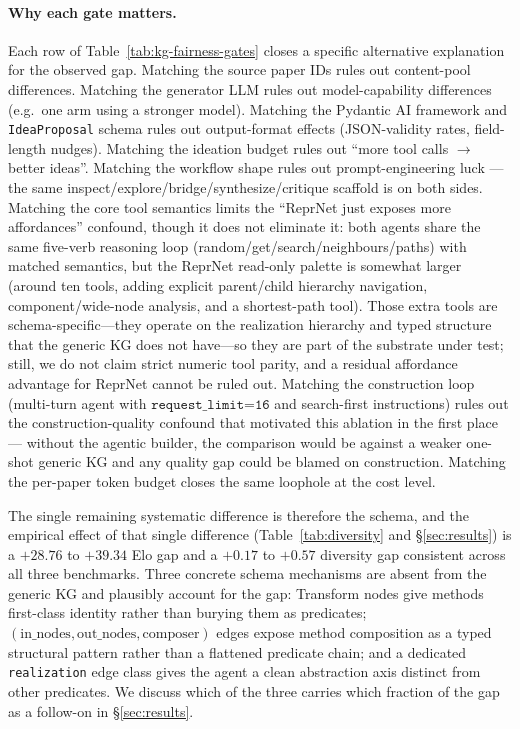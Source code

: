 \documentclass[10pt,twocolumn]{article}
\begin{document}
\paragraph{Why each gate matters.}  Each row of
Table~\ref{tab:kg-fairness-gates} closes a specific alternative
explanation for the observed gap.  Matching the source paper IDs
rules out content-pool differences.  Matching the generator LLM
rules out model-capability differences (e.g.\ one arm using a
stronger model).  Matching the Pydantic AI framework and
\texttt{IdeaProposal} schema rules out output-format effects
(JSON-validity rates, field-length nudges).  Matching the ideation
budget rules out ``more tool calls $\to$ better ideas''.  Matching
the workflow shape rules out prompt-engineering luck --- the same
inspect/explore/bridge/synthesize/critique scaffold is on both
sides.  Matching the core tool semantics limits the
``ReprNet just exposes more affordances'' confound, though it does not
eliminate it: both agents share the same five-verb reasoning loop
(random/get/search/neighbours/paths) with matched semantics, but the
ReprNet read-only palette is somewhat larger (around ten tools, adding
explicit parent/child hierarchy navigation, component/wide-node
analysis, and a shortest-path tool).  Those extra tools are
schema-specific---they operate on the realization hierarchy and typed
structure that the generic KG does not have---so they are part of the
substrate under test; still, we do not claim strict numeric tool
parity, and a residual affordance advantage for ReprNet cannot be
ruled out.  Matching the
construction loop (multi-turn agent with $\texttt{request\_limit=16}$
and search-first instructions) rules out the construction-quality
confound that motivated this ablation in the first place ---
without the agentic builder, the comparison would be against a
weaker one-shot generic KG and any quality gap could be blamed on
construction.  Matching the per-paper token budget closes the same
loophole at the cost level.

The single remaining systematic difference is therefore the
schema, and the empirical effect of that single difference
(Table~\ref{tab:diversity} and \S\ref{sec:results}) is a
$+28.76$ to $+39.34$ Elo gap and a $+0.17$ to $+0.57$ diversity
gap consistent across all three benchmarks.  Three concrete
schema mechanisms are absent from the generic KG and plausibly
account for the gap: Transform nodes give methods first-class
identity rather than burying them as predicates;
$(\text{in\_nodes}, \text{out\_nodes}, \text{composer})$ edges
expose method composition as a typed structural pattern rather
than a flattened predicate chain; and a dedicated
\texttt{realization} edge class gives the agent a clean
abstraction axis distinct from other predicates.  We discuss
which of the three carries which fraction of the gap as a
follow-on in \S\ref{sec:results}.
\end{document}
